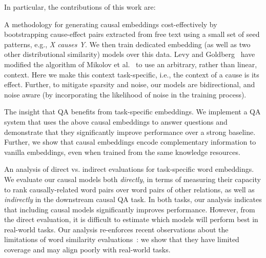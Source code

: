 In particular, the contributions of this work are:


{} 
A methodology for generating causal embeddings cost-effectively by bootstrapping cause-effect pairs extracted from free text using a small set of seed patterns, e.g., {\em X causes Y}. 
We then train dedicated embedding (as well as two other distributional similarity) models over this data. Levy and Goldberg~ have modified the algorithm of Mikolov et al.~ to use an arbitrary, rather than linear, context. Here we make this context task-specific, i.e., the context of a cause is its effect.
Further, to mitigate sparsity and noise, our models are bidirectional, and noise aware (by incorporating the likelihood of noise in the training process). 

{} The insight that QA benefits from task-specific embeddings. %
We implement a QA system that uses the above causal embeddings to answer questions and demonstrate that they significantly improve performance over a strong baseline. Further, we show that causal embeddings encode complementary information to vanilla embeddings, even when trained from the same knowledge resources. 

{} An analysis of direct vs. indirect evaluations for task-specific word embeddings. 
We evaluate our causal models both  {\em directly}, in terms of measuring their capacity to rank causally-related word pairs over word pairs of other relations, as well as {\em indirectly} in the downstream causal QA task. 
In both tasks, our analysis indicates that including causal models significantly improves performance. 
However, from the direct evaluation, it is difficult to estimate which models will perform best in real-world tasks. Our analysis re-enforces recent observations about the limitations of word similarity evaluations~\cite{faruqui2016problems}: we show that they have limited coverage and may align poorly with real-world tasks.

